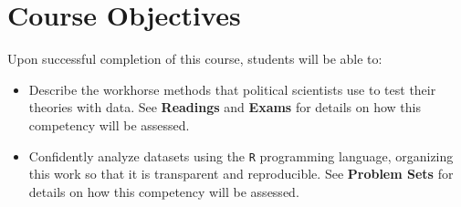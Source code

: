 \documentclass[11pt, letterpaper]{article}
\begin{document}
\section*{Course Objectives}
Upon successful completion of this course, students will be able to:
\begin{itemize}
	\item Describe the workhorse methods that political scientists use to test their theories with data. See \textbf{Readings} and \textbf{Exams} for details on how this competency will be assessed.
	\item Confidently analyze datasets using the \texttt{R} programming language, organizing this work so that it is transparent and reproducible. See \textbf{Problem Sets} for details on how this competency will be assessed.
\end{itemize}
\end{document}
